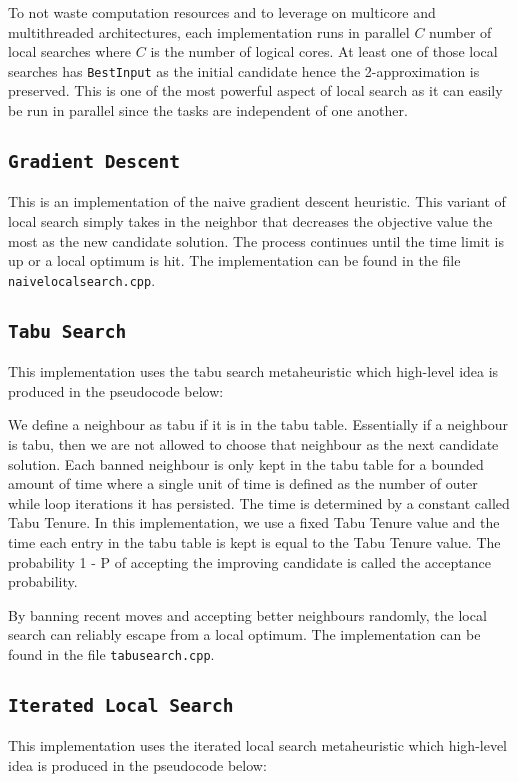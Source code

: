 To not waste computation resources and to leverage on multicore and multithreaded architectures, each implementation runs in parallel $C$ number of local searches where $C$ is the number of logical cores. At least one of those local searches has \texttt{BestInput} as the initial candidate hence the 2-approximation is preserved. This is one of the most powerful aspect of local search as it can easily be run in parallel since the tasks are independent of one another.

\subsection{\texttt{Gradient Descent}}
This is an implementation of the naive gradient descent heuristic. This variant of local search simply takes in the neighbor that decreases the objective value the most as the new candidate solution. The process continues until the time limit is up or a local optimum is hit. The implementation can be found in the file \texttt{naive\textunderscore local\textunderscore search.cpp}.

\subsection{\texttt{Tabu Search}}
This implementation uses the tabu search metaheuristic which high-level idea is produced in the pseudocode below:



We define a neighbour as tabu if it is in the tabu table. Essentially if a neighbour is tabu, then we are not allowed to choose that neighbour as the next candidate solution. Each banned neighbour is only kept in the tabu table for a bounded amount of time where a single unit of time is defined as the number of outer while loop iterations it has persisted. The time is determined by a constant called Tabu Tenure. In this implementation, we use a fixed Tabu Tenure value and the time each entry in the tabu table is kept is equal to the Tabu Tenure value. The probability 1 - P of accepting the improving candidate is called the acceptance probability.

By banning recent moves and accepting better neighbours randomly, the local search can reliably escape from a local optimum. The implementation can be found in the file \texttt{tabu\textunderscore search.cpp}.

\subsection{\texttt{Iterated Local Search}}
This implementation uses the iterated local search metaheuristic which high-level idea is produced in the pseudocode below:

